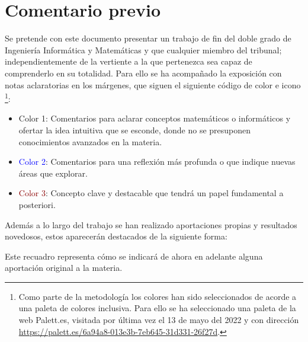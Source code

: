 
\section*{Comentario previo}

Se pretende con este documento presentar un  trabajo de fin del doble grado de Ingeniería Informática y Matemáticas y que cualquier miembro del tribunal; 
independientemente de la vertiente a la que pertenezca sea capaz de comprenderlo en su totalidad.  
Para ello se ha acompañado la exposición con notas aclaratorias en los márgenes, que siguen el siguiente código de color e icono \footnote{Como parte de la metodología los colores han sido seleccionados de acorde a una paleta de colores inclusiva.
Para ello se ha seleccionado una paleta de la web Palett.es, 
visitada por última vez el 13 de mayo del 2022 
y con dirección \url{https://palett.es/6a94a8-013e3b-7eb645-31d331-26f27d}.
 }: 

\begin{itemize}
    \item  \iconoAclaraciones \textcolor{dark_green}{ Color 1}: Comentarios para 
    aclarar conceptos matemáticos o informáticos y ofertar la idea intuitiva que 
    se esconde, donde no se presuponen conocimientos avanzados en 
    la materia. 
    \item  \iconoProfundizar \textcolor{blue}{  Color 2}: Comentarios para una reflexión más profunda o que indique nuevas áreas que explorar. 
    \item  \iconoClave  \textcolor{darkRed}{  Color 3}: Concepto clave y destacable que tendrá un papel fundamental a posteriori.  
\end{itemize}

Además a lo largo del trabajo se han realizado aportaciones propias y resultados novedosos, estos aparecerán destacados de la siguiente forma: 

\begin{aportacionOriginal}
    Este recuadro representa cómo se indicará de ahora en adelante alguna aportación original a la materia. 
\end{aportacionOriginal}
